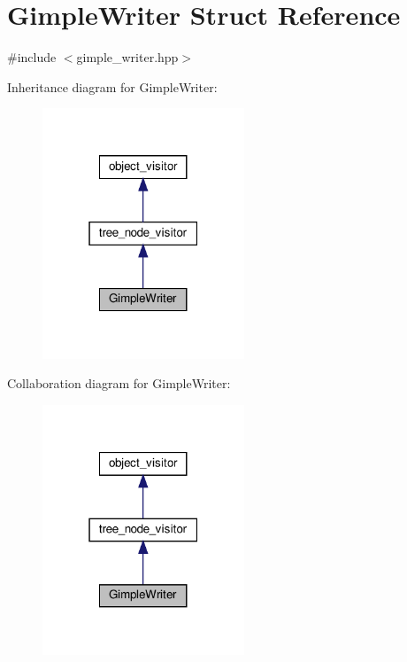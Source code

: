 \hypertarget{structGimpleWriter}{}\section{Gimple\+Writer Struct Reference}
\label{structGimpleWriter}


{\ttfamily \#include $<$gimple\+\_\+writer.\+hpp$>$}



Inheritance diagram for Gimple\+Writer\+:
\nopagebreak
\begin{figure}[H]
\begin{center}
\leavevmode
\includegraphics[width=171pt]{db/d65/structGimpleWriter__inherit__graph}
\end{center}
\end{figure}


Collaboration diagram for Gimple\+Writer\+:
\nopagebreak
\begin{figure}[H]
\begin{center}
\leavevmode
\includegraphics[width=171pt]{d6/d4e/structGimpleWriter__coll__graph}
\end{center}
\end{figure}
